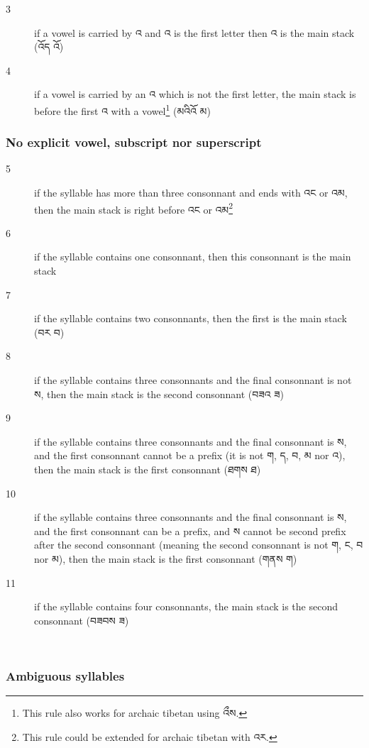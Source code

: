 \documentclass[%
a4paper,%
pagesize,%
12pt,%
parskip=off,%
bibliography=totoc,%
numbers=noenddot,%
DIV=12,%
twoside=semi,%
headings=normal%
]{scrartcl}
\begin{document}
\begin{description}
\item[3] if a vowel is carried by འ and འ is the first letter then འ is the main stack (འོད \rightarrow{} འོ)
\item[4] if a vowel is carried by an འ which is not the first letter, the main stack is before the first འ with a vowel\footnote{This rule also works for archaic tibetan using འྀས.} (མའིའོ \rightarrow{} མ)
\end{description}

\subsubsection*{No explicit vowel, subscript nor superscript}

\begin{description}
\item[5] if the syllable has more than three consonnant and ends with འང or འམ, then the main stack is right before འང or འམ\footnote{This rule could be extended for archaic tibetan with འར.}
\item[6] if the syllable contains one consonnant, then this consonnant is the main stack
\item[7] if the syllable contains two consonnants, then the first is the main stack (བར \rightarrow{} བ)
\item[8] if the syllable contains three consonnants and the final consonnant is not ས, then the main stack is the second consonnant (བཟའ \rightarrow{} ཟ)
\item[9] if the syllable contains three consonnants and the final consonnant is ས, and the first consonnant cannot be a prefix (it is not ག, ད, བ, མ nor འ), then the main stack is the first consonnant (ཐགས \rightarrow{} ཐ)
\item[10] if the syllable contains three consonnants and the final consonnant is ས, and the first consonnant can be a prefix, and ས cannot be second prefix after the second consonnant (meaning the second consonnant is not ག, ང, བ nor མ), then the main stack is the first consonnant (གནས \rightarrow{} ག)
\item[11] if the syllable contains four consonnants, the main stack is the second consonnant (བཟབས \rightarrow{} ཟ)
\end{description}

­\subsubsection*{Ambiguous syllables}
\end{document}
